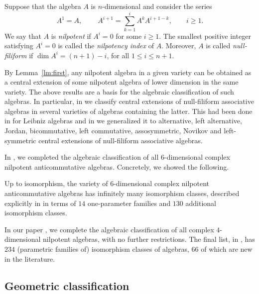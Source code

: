 \documentclass{commat}
\begin{document}
Suppose that the algebra $A$ is $n$-dimensional and consider the series
\[{A}^1={A}, \qquad \ {A}^{i+1}=\sum\limits_{k=1}^{i}{A}^k {A}^{i+1-k}, \qquad i\geq 1.\]
We say that ${A}$ is \emph{nilpotent} if ${A}^{i}=0$ for some $i \geq 1$. The smallest positive integer satisfying ${A}^{i}=0$ is called the  \emph{nilpotency index} of ${A}$.
Moreover, ${A}$ is called {\it null-filiform} if $\dim {A}^i=(n+ 1)-i$, for all $1\leq  i\leq n+1$.



By Lemma~\ref{lm:first}, any nilpotent algebra in a given variety can be obtained as a central extension of some nilpotent algebra of lower dimension in the same variety. The above results are a basis for the algebraic classification of such algebras. In particular, in \cite{KLP20} we classify central extensions of null-filiform associative algebras in several varieties of algebras containing the latter. This had been done in \cite{ACO17} for Leibniz algebras and in \cite{KLP20} we generalized it to  alternative, left alternative, Jordan, bicommutative, left commutative, assosymmetric, Novikov and left-symmetric  central extensions of null-filiform associative algebras. 


In \cite{KKL20}, we completed the algebraic classification of all $6$-dimensional complex nilpotent anticommutative algebras. Concretely, we showed the following.

\begin{theorem}
	Up to isomorphism, the variety of $6$-dimensional complex nilpotent anticommutative algebras has infinitely many isomorphism classes, described explicitly in \cite[App.\ B]{KKL20} in terms of $14$ one-parameter families and $130$ additional isomorphism classes. 
\end{theorem}

In our paper \cite{KKL22}, we complete the algebraic classification of all complex $4$-dimensional nilpotent algebras, with no further restrictions. The final list, in \cite[Thm.\ 2]{KKL22},
has $234$ (parametric families of) isomorphism classes of algebras, $66$ of which are new in the literature.






\subsection{Geometric classification}\label{SS:naa:geom}
\end{document}
